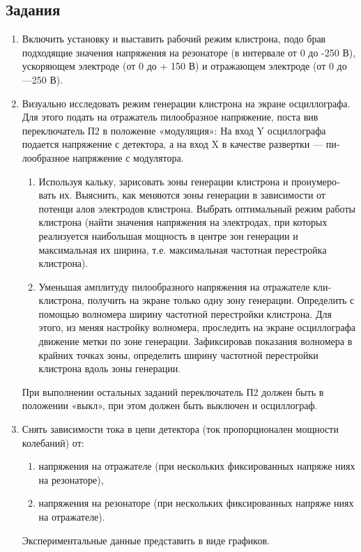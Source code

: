 \subsection{Задания}
\begin{enumerate}
	\item  Включить установку и выставить рабочий режим клистрона, подо­
	брав подходящие значения напряжения на резонаторе (в интервале от 0 до
	-250 В), ускоряющем электроде (от 0 до + 150 В) и отражающем электроде
	(от 0 до —250 В).
	\item  Визуально исследовать режим генерации клистрона на экране осцил­лографа. Для этого подать на отражатель пилообразное напряжение, поста­
	вив переключатель П2 в положение «модуляция»: На вход Y осциллографа
	подается напряжение с детектора, а на вход X в качестве развертки — пи­лообразное напряжение с модулятора.
		\begin{enumerate}
			\item Используя кальку, зарисовать зоны генерации клистрона и пронумеро­
			вать их. Выяснить, как меняются зоны генерации в зависимости от потенци­
			алов электродов клистрона. Выбрать оптимальный режим работы клистро­на (найти значения напряжения на электродах, при которых реализуется наибольшая мощность в центре зон генерации и максимальная их ширина, т.е. максимальная частотная перестройка клистрона).
			\item Уменьшая амплитуду пилообразного напряжения на отражателе кли­
			клистрона, получить на экране только одну зону генерации. Определить с по­мощью волномера ширину частотной перестройки клистрона. Для этого, из­
			меняя настройку волномера, проследить на экране осциллографа движение
			метки по зоне генерации. Зафиксировав показания волномера в крайних
			точках зоны, определить ширину частотной перестройки клистрона вдоль
			зоны генерации.
		\end{enumerate}
	
	При выполнении остальных заданий переключатель П2 должен быть в
	положении «выкл», при этом должен быть выключен и осциллограф.

	\item Снять зависимости тока в цепи детектора (ток пропорционален мощ­ности колебаний) от: 
		\begin{enumerate}
			\item напряжения на отражателе (при нескольких фиксированных напряже­
			ниях на резонаторе),
			\item напряжения на резонаторе (при нескольких фиксированных напряже­
			ниях на отражателе).
		\end{enumerate} 
	Экспериментальные данные представить в виде графиков.
	

\end{enumerate}
